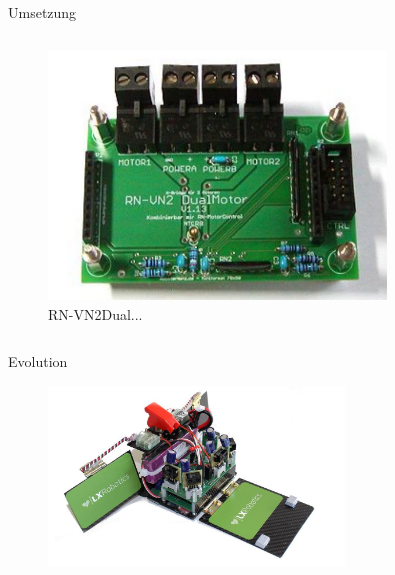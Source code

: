 \documentclass{beamer}
\begin{document}
\begin{frame}{Umsetzung}
\begin{columns}
\begin{column}{0.3\textwidth}
\begin{figure}
		\centering
		\includegraphics[width=0.8\textwidth]{./images/rn-vnh2dualmotor.jpg}
		\caption{RN-VN2Dual...\cite{Image:RNVN2DualMotor}}
	\end{figure}
	\end{column}
\end{columns}
\end{frame}
\begin{frame}{Evolution}
 \begin{figure}[H]
  \centering
  \includegraphics[width=0.7\textwidth]{./images/robot-evolution.jpg}
 \end{figure}
\end{frame}
\end{document}
